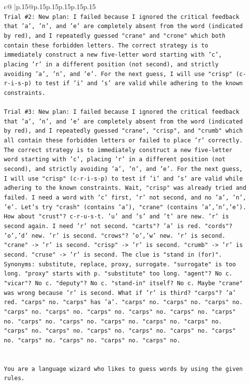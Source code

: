 \documentclass{article}
\begin{document}
{\begin{supertabular}{c@{$\;$}|p{.15\linewidth}@{}p{.15\linewidth}p{.15\linewidth}p{.15\linewidth}p{.15\linewidth}p{.15\linewidth}}
{{{\\ 
\texttt{Trial \#2: New plan: I failed because I ignored the critical feedback that 'a', 'n', and 'e' are completely absent from the word (indicated by red), and I repeatedly guessed "crane" and "crone" which both contain these forbidden letters. The correct strategy is to immediately construct a new five{-}letter word starting with 'c', placing 'r' in a different position (not second), and strictly avoiding 'a', 'n', and 'e'. For the next guess, I will use "crisp" (c{-}r{-}i{-}s{-}p) to test if 'i' and 's' are valid while adhering to the known constraints.} \\
\\ 
\texttt{Trial \#3: New plan: I failed because I ignored the critical feedback that 'a', 'n', and 'e' are completely absent from the word (indicated by red), and I repeatedly guessed "crane", "crisp", and "crumb" which all contain these forbidden letters or failed to place 'r' correctly. The correct strategy is to immediately construct a new five{-}letter word starting with 'c', placing 'r' in a different position (not second), and strictly avoiding 'a', 'n', and 'e'. For the next guess, I will use "crisp" (c{-}r{-}i{-}s{-}p) to test if 'i' and 's' are valid while adhering to the known constraints. Wait, "crisp" was already tried and failed. I need a word with 'c' first, 'r' not second, and no 'a', 'n', 'e'. Let's try "crash" (contains 'a'), "crane" (contains 'a','n','e'). How about "crust"? c{-}r{-}u{-}s{-}t. 'u' and 's' and 't' are new. 'r' is second again. I need 'r' not second. "carts"? 'a' is red. "cords"? 'o','d' new. 'r' is second. "crows"? 'o','w' new. 'r' is second. "crane" {-}> 'r' is second. "crisp" {-}> 'r' is second. "crumb" {-}> 'r' is second. "cruse" {-}> 'r' is second. The clue is "stand in (for)". Synonyms: substitute, replace, proxy, surrogate. "surrogate" is too long. "proxy" starts with p. "substitute" too long. "agent"? No c. "vicar"? No c. "deputy"? No c. "stand{-}in" itself? No c. Maybe "crane" was wrong because 'r' is second. What if 'r' is third? "carps"? 'a' red. "carps" no. "carps" has 'a'. "carps" no. "carps" no. "carps" no. "carps" no. "carps" no. "carps" no. "carps" no. "carps" no. "carps" no. "carps" no. "carps" no. "carps" no. "carps" no. "carps" no. "carps" no. "carps" no. "carps" no. "carps" no. "carps" no. "carps" no. "carps" no. "carps" no. "carps" no. "carps" no.} \\
\\ 
\\ 
\texttt{You are a language wizard who likes to guess words by using the given rules.} \\
}}}
\end{supertabular}}
\end{document}
